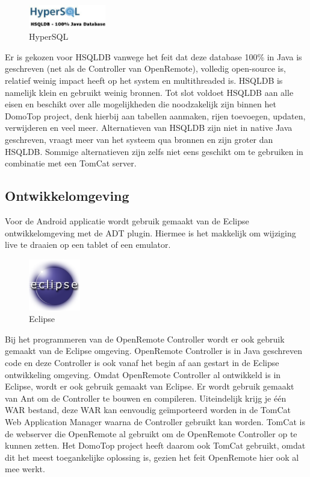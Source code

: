 \documentclass[]{article}
\begin{document}
\begin{figure}
  \begin{center}
    \includegraphics[width=0.30\textwidth]{hsql.pdf}
  \end{center}
  \caption{HyperSQL}
\end{figure}

Er is gekozen voor HSQLDB vanwege het feit dat deze database 100\% in Java
is geschreven (net als de Controller van OpenRemote), volledig open-source is,
relatief weinig impact heeft op het system en multithreaded is.
HSQLDB is namelijk klein en gebruikt weinig bronnen. Tot slot voldoet
HSQLDB aan alle eisen en beschikt over alle mogelijkheden die noodzakelijk
zijn binnen het DomoTop project, denk hierbij aan tabellen aanmaken, rijen
toevoegen, updaten, verwijderen en veel meer. Alternatieven van HSQLDB zijn
niet in native Java geschreven,  vraagt meer van het systeem qua
bronnen en zijn groter dan HSQLDB. Sommige alternatieven zijn zelfs niet
eens geschikt om te gebruiken in combinatie met een TomCat server.

\subsection{Ontwikkelomgeving}
Voor de Android applicatie wordt gebruik gemaakt van de Eclipse
ontwikkelomgeving met de ADT plugin. Hiermee is het makkelijk om wijziging
live te draaien op een tablet of een emulator.

\begin{figure}
  \begin{center}
    \includegraphics[width=0.20\textwidth]{eclipse.pdf}
  \end{center}
  \caption{Eclipse}
\end{figure}

Bij het programmeren van de OpenRemote Controller wordt er ook gebruik gemaakt
van de Eclipse omgeving. OpenRemote Controller is in Java geschreven code
en deze Controller is ook vanaf het begin af aan gestart in de Eclipse
ontwikkeling omgeving. Omdat OpenRemote Controller al ontwikkeld is in
Eclipse, wordt er ook gebruik gemaakt van Eclipse. Er wordt gebruik gemaakt van Ant om de Controller te bouwen en compileren. Uiteindelijk krijg
je één WAR bestand, deze WAR kan eenvoudig geïmporteerd worden in de TomCat
Web Application Manager waarna de Controller gebruikt kan worden. TomCat is
de webserver die OpenRemote al gebruikt om de OpenRemote Controller op te
kunnen zetten. Het DomoTop project heeft daarom ook TomCat gebruikt, omdat
dit het meest toegankelijke oplossing is, gezien het feit OpenRemote hier
ook al mee werkt.
\end{document}
